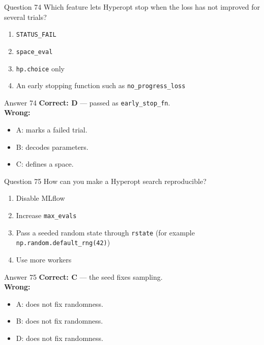 \documentclass[aspectratio=169,11pt]{beamer}
\begin{document}
\begin{frame}{Question 74}
Which feature lets Hyperopt stop when the loss has not improved for several trials?
\begin{enumerate}[label=\Alph*.]
\item \texttt{STATUS\_FAIL}
\item \texttt{space\_eval}
\item \texttt{hp.choice} only
\item An early stopping function such as \texttt{no\_progress\_loss}
\end{enumerate}
\end{frame}
\begin{frame}{Answer 74}
\textbf{Correct: D} --- passed as \texttt{early\_stop\_fn}.\\
\vspace{0.5em}
\textbf{Wrong:}
\begin{itemize}
\item A: marks a failed trial.
\item B: decodes parameters.
\item C: defines a space.
\end{itemize}
\end{frame}

\begin{frame}{Question 75}
How can you make a Hyperopt search reproducible?
\begin{enumerate}[label=\Alph*.]
\item Disable MLflow
\item Increase \texttt{max\_evals}
\item Pass a seeded random state through \texttt{rstate} (for example \texttt{np.random.default\_rng(42)})
\item Use more workers
\end{enumerate}
\end{frame}
\begin{frame}{Answer 75}
\textbf{Correct: C} --- the seed fixes sampling.\\
\vspace{0.5em}
\textbf{Wrong:}
\begin{itemize}
\item A: does not fix randomness.
\item B: does not fix randomness.
\item D: does not fix randomness.
\end{itemize}
\end{frame}
\end{document}

